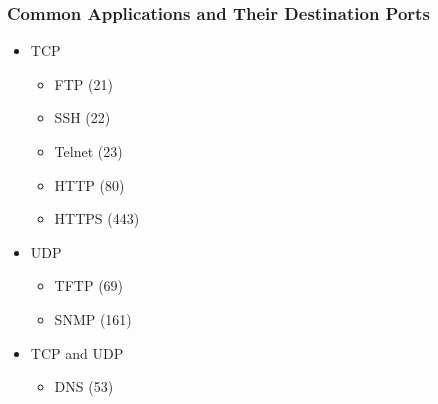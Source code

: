 \documentclass[pdflatex,compress]{beamer}
\begin{document}
\begin{frame}
	\frametitle{Common Applications and Their Destination Ports}
	\begin{itemize}
		\item TCP
		\begin{itemize}
			\item FTP (21)
			\item SSH (22)
			\item Telnet (23)
			\item HTTP (80)
			\item HTTPS (443)
		\end{itemize}
		\item UDP
		\begin{itemize}
			\item TFTP (69)
			\item SNMP (161)
		\end{itemize}
		\item TCP and UDP
		\begin{itemize}
			\item DNS (53)
		\end{itemize}
	\end{itemize}
\end{frame}
\end{document}
